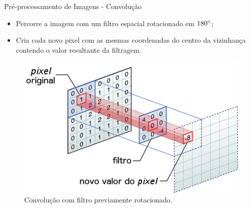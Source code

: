 \documentclass{beamer}
\begin{document}
\begin{frame}{Pré-processamento de Imagens - Convolução}
\setlength\leftmargini{0em}
\justifying
{}
\begin{itemize}
    \item Percorre a imagem com um filtro espacial rotacionado em $180\degree$; \\
    \item Cria cada novo pixel com as mesmas coordenadas do centro da vizinhança contendo o valor resultante da filtragem.
\end{itemize}
\begin{figure}[htbp]
 \begin{center}
   \includegraphics[width=.5\linewidth]{figuras/convolucao.png}
 \caption{Convolução com filtro previamente rotacionado.}
 \end{center}
\end{figure}
\end{frame}
\end{document}
